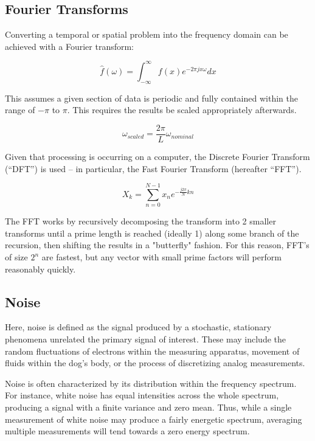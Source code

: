 \documentclass[journal]{IEEEtran}
\begin{document}
\subsection{Fourier Transforms}
Converting a temporal or spatial problem into the frequency domain can be achieved with a Fourier transform:

\begin{equation}
\hat{f}(\omega)=\int_{-\infty}^{\infty}f(x)e^{-2 \pi jx \omega}dx
\end{equation}

This assumes a given section of data is periodic and fully contained within the range of $-\pi$ to $\pi$. This requires the results be scaled appropriately afterwards.

\begin{equation}
\omega_{scaled}=\frac{2\pi}{L}\omega_{nominal}
\end{equation}

Given that processing is occurring on a computer, the Discrete Fourier Transform (``DFT'') is used -- in particular, the Fast Fourier Transform (hereafter ``FFT'').

\begin{equation}
X_{k}=\sum_{n=0}^{N-1}x_{n}e^{-\frac{j2\pi}{N}kn}
\end{equation}

The FFT works by recursively decomposing the transform into 2 smaller transforms until a prime length is reached (ideally 1) along some branch of the recursion, then shifting the results in a "butterfly" fashion. For this reason, FFT's of size $2^n$ are fastest, but any vector with small prime factors will perform reasonably quickly.

\subsection{Noise}
Here, noise is defined as the signal produced by a stochastic, stationary phenomena unrelated the primary signal of interest. These may include the random fluctuations of electrons within the measuring apparatus, movement of fluids within the dog's body, or the process of discretizing analog measurements.

Noise is often characterized by its distribution within the frequency spectrum. For instance, white noise has equal intensities across the whole spectrum, producing a signal with a finite variance and zero mean. Thus, while a single measurement of white noise may produce a fairly energetic spectrum, averaging multiple measurements will tend towards a zero energy spectrum.
\end{document}
